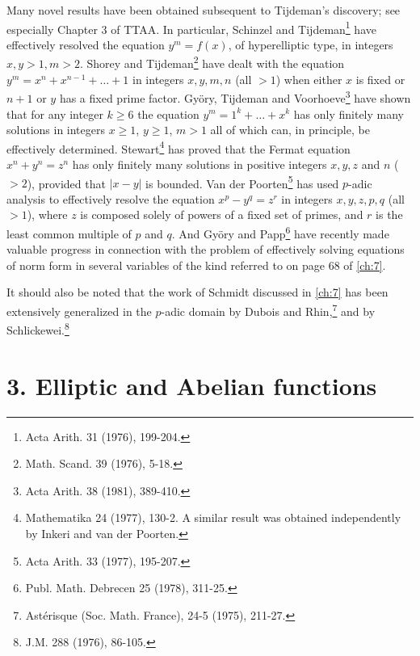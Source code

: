 Many novel results have been obtained subsequent to Tijdeman's discovery; see especially Chapter 3 of TTAA. In particular, Schinzel and Tijdeman\footnote{Acta Arith. 31 (1976), 199-204.} have effectively resolved the equation \(y^m = f(x)\), of hyperelliptic type, in integers \(x, y > 1, m > 2\). Shorey and Tijdeman\footnote{Math. Scand. 39 (1976), 5-18.} have dealt with the equation \(y^m = x^n + x^{n-1} + \dots + 1\) in integers \(x, y, m, n\) (all \({}>1\)) when either \(x\) is fixed or \(n + 1\) or \(y\) has a fixed prime factor. Gy{\"o}ry, Tijdeman and Voorhoeve\footnote{Acta Arith. 38 (1981), 389-410.} have shown that for any integer \(k \ge 6\) the equation \(y^m = 1^k + \dots + x^k\) has only finitely many solutions in integers \(x \ge 1\), \(y \ge 1\), \(m > 1\) all of which can, in principle, be effectively determined. Stewart\footnote{Mathematika 24 (1977), 130-2. A similar result was obtained independently by Inkeri and van der Poorten.} has proved that the Fermat equation \(x^n + y^n = z^n\) has only finitely many solutions in positive integers \(x, y, z\) and \(n\) (\({}>2\)), provided that \(|x-y|\) is bounded. Van der Poorten\footnote{Acta Arith. 33 (1977), 195-207.} has used \(p\)-adic analysis to effectively resolve the equation \(x^p - y^q = z^r\) in integers \(x, y, z, p, q\) (all \({}> 1\)), where \(z\) is composed solely of powers of a fixed set of primes, and \(r\) is the least common multiple of \(p\) and \(q\). And Gy{\"o}ry and Papp\footnote{Publ. Math. Debrecen 25 (1978), 311-25.} have recently made valuable progress in connection with the problem of effectively solving equations of norm form in several variables of the kind referred to on page 68 of \autoref{ch:7}.

It should also be noted that the work of Schmidt discussed in \autoref{ch:7} has been extensively generalized in the \(p\)-adic domain by Dubois and Rhin,\footnote{Ast{\'e}risque (Soc. Math. France), 24-5 (1975), 211-27.} and by Schlickewei.\footnote{J.M. 288 (1976), 86-105.}

\section*{3. Elliptic and Abelian functions}

